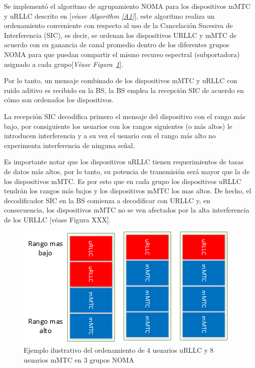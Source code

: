 Se implementó el algoritmo de agrupamiento NOMA para los dispositivos mMTC y uRLLC descrito en \parencite{Shahini2019}[\textit{véase Algorithm \ref{A1}}], este algoritmo realiza un ordenamiento conveniente con respecto al uso de la Cancelación Sucesiva de Interferencia (SIC), es decir, se ordenan los dispositivos URLLC y mMTC de acuerdo con su ganancia de canal promedio dentro de los diferentes grupos NOMA para que puedan compartir el mismo recurso espectral (subportadora) asignado a cada grupo[\textit{Véase Figura~\ref{fig:NOMAgrupoexample}}].\newline

Por lo tanto, un mensaje combinado de los dispositivos mMTC y uRLLC con ruido aditivo es recibido en la BS, la BS emplea la recepción SIC de acuerdo en cómo son ordenados los dispositivos. \newline

La recepción SIC decodifica primero el mensaje del dispositivo con el rango más bajo, por consiguiente los usuarios con los rangos siguientes (o más altos) le introducen interferencia y a su vez el usuario con el rango más alto no experimenta interferencia de ninguna señal.\newline

Es importante notar que los dispositivos uRLLC tienen requerimientos de tasas de datos más altos, por lo tanto, su potencia de transmisión será mayor que la de los dispositivos mMTC. Es por esto que en cada grupo los dispositivos uRLLC tendrán los rangos más bajos y los dispositivos mMTC los mas altos. De hecho, el decodificador SIC en la BS comienza a decodificar con URLLC y, en consecuencia, los dispositivos mMTC no se ven afectados por la alta interferencia de los URLLC [véase Figura XXX].\newline

\begin{figure}[th]
    \centering
    \includegraphics[scale=1]{Figures/EjemploNOMAclusters}
    \decoRule
    \caption[Ejemplo ilustrativo del ordenamiento de usuarios en los grupos NOMA]{Ejemplo ilustrativo del ordenamiento de 4 usuarios uRLLC y 8 usuarios mMTC en 3 grupos NOMA}
    \label{fig:NOMAgrupoexample}
\end{figure}


